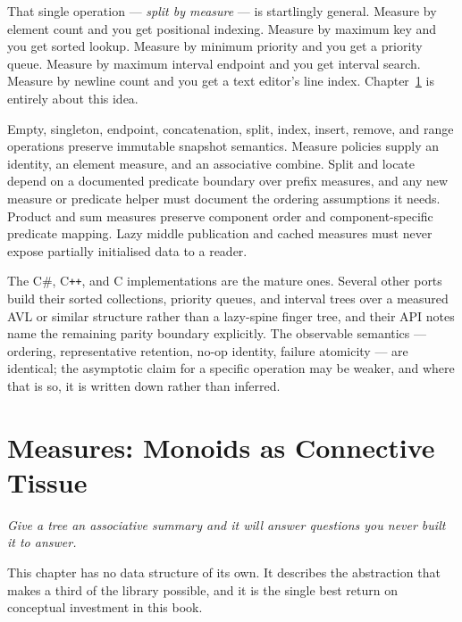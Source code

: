 \documentclass[11pt,twoside,openright]{book}
\newcommand{\term}[1]{\textit{#1}}
\newcommand{\motto}[1]{%
  \begingroup
  \vspace{-4pt}\hfill\begin{minipage}{0.80\textwidth}
    \raggedleft\itshape\color{d7slate}\small #1\par
  \end{minipage}\par\vspace{18pt}
  \endgroup}
\begin{document}
That single operation --- \term{split by measure} --- is startlingly general.
Measure by element count and you get positional indexing. Measure by maximum key
and you get sorted lookup. Measure by minimum priority and you get a priority
queue. Measure by maximum interval endpoint and you get interval search. Measure
by newline count and you get a text editor's line index. Chapter~\ref{ch:measures}
is entirely about this idea.

\begin{contractbox}
Empty, singleton, endpoint, concatenation, split, index, insert, remove, and
range operations preserve immutable snapshot semantics. Measure policies supply
an identity, an element measure, and an associative combine. Split and locate
depend on a documented predicate boundary over prefix measures, and any new
measure or predicate helper must document the ordering assumptions it needs.
Product and sum measures preserve component order and component-specific
predicate mapping. Lazy middle publication and cached measures must never expose
partially initialised data to a reader.
\end{contractbox}

\begin{caveatbox}
The C\#, C\texttt{++}, and C implementations are the mature ones. Several other
ports build their sorted collections, priority queues, and interval trees over a
measured AVL or similar structure rather than a lazy-spine finger tree, and
their API notes name the remaining parity boundary explicitly. The observable
semantics --- ordering, representative retention, no-op identity, failure
atomicity --- are identical; the asymptotic claim for a specific operation may
be weaker, and where that is so, it is written down rather than inferred.
\end{caveatbox}

\chapter{Measures: Monoids as Connective Tissue}
\label{ch:measures}

\motto{Give a tree an associative summary and it will answer questions you never
built it to answer.}

\noindent
This chapter has no data structure of its own. It describes the abstraction that
makes a third of the library possible, and it is the single best return on
conceptual investment in this book.
\end{document}
